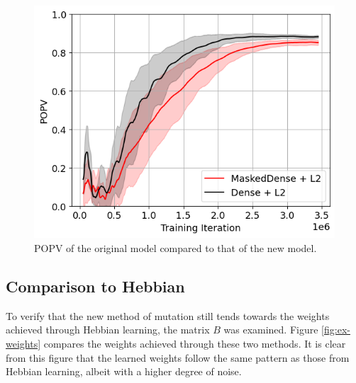 \documentclass[twocolumn,a4paper,11pt]{article}
\begin{document}
    \begin{figure}[h]
        \centering
        \includegraphics[width=0.8\linewidth]{ex-img/final-l2-popv.png}
        \caption{POPV of the original model compared to that of the new model.} \label{fig:ex-B2}
    \end{figure}

    \subsection{Comparison to Hebbian}
    To verify that the new method of mutation still tends towards the weights achieved through Hebbian learning, the matrix $B$ was examined. Figure \ref{fig:ex-weights} compares the weights achieved through these two methods. It is clear from this figure that the learned weights follow the same pattern as those from Hebbian learning, albeit with a higher degree of noise.
\end{document}
